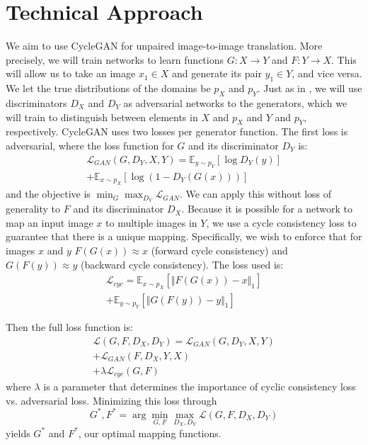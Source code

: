 \documentclass[10pt,twocolumn,letterpaper]{article}
\begin{document}
\section{Technical Approach}
We aim to use CycleGAN \cite{cycleGAN} for unpaired image-to-image translation.
More precisely, we will train networks to learn functions $G : X \rightarrow Y$ and $F: Y \rightarrow X$.
This will allow us to take an image $x_1 \in X$ and generate its pair $y_1 \in Y$, and vice versa.
We let the true distributions of the domains be $p_X$ and $p_Y$.
Just as in \cite{gan}, we will use discriminators $D_X$ and $D_Y$ as adversarial networks to the generators, which we will train to distinguish between elements in $X$ and $p_X$ and $Y$ and $p_Y$, respectively.
CycleGAN uses two losses per generator function.
The first loss is adversarial, where the loss function for $G$ and its discriminator $D_Y$ is:
\begin{equation}
\begin{split}
\displaystyle \mathcal{L}_{GAN}(G, D_Y, X, Y) = 
\mathbb{E}_{y \sim p_Y}[\log{D_Y(y)}]
\\ + \mathbb{E}_{x \sim p_X}[\log{(1 - D_Y(G(x)))}]
\end{split}
\end{equation}
and the objective is $\displaystyle \min_{G} \max_{D_Y} \mathcal{L}_{GAN}$.
We can apply this without loss of generality to $F$ and its discriminator $D_X$.
Because it is possible for a network to map an input image $x$ to multiple images in $Y$, we use a cycle consistency loss to guarantee that there is a unique mapping.
Specifically, we wish to enforce that for images $x$ and $y$ $F(G(x)) \approx x$ (forward cycle consistency) and $G(F(y)) \approx y$ (backward cycle consistency).
The loss used is:
\begin{equation}
\begin{split}
\displaystyle \mathcal{L}_{cyc} = 
\mathbb{E}_{x \sim p_X}[\Vert{F(G(x)) - x}\Vert_1]
\\ + \mathbb{E}_{y \sim p_Y}[\Vert{G(F(y)) - y}\Vert_1]
\end{split}
\end{equation}

Then the full loss function is:
\begin{equation}
\begin{split}
\displaystyle \mathcal{L}(G, F, D_X, D_Y) = 
\mathcal{L}_{GAN}(G, D_Y, X, Y)
\\+ \mathcal{L}_{GAN}(F, D_X, Y, X)
\\+ \lambda\mathcal{L}_{cyc}(G, F)
\end{split}
\end{equation}
where $\lambda$ is a parameter that determines the importance of cyclic consistency loss vs. adversarial loss.
Minimizing this loss through
\begin{equation}
\displaystyle G^*, F^* = \arg\min_{G, F}\max_{D_X, D_Y} \mathcal{L}(G, F, D_X, D_Y)
\end{equation}
yields $G^*$ and $F^*$, our optimal mapping functions.
\end{document}
